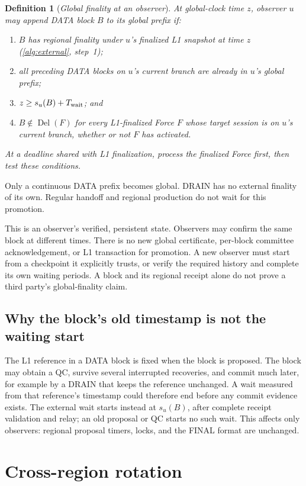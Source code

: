 \documentclass[11pt,a4paper]{article}
\newcommand{\Del}{\operatorname{Del}}
\newcommand{\Twait}{T_{\rm wait}}
\newcommand{\defterm}[1]{\textcolor{rrBlue}{\textit{#1}}}
\newtheorem{definition}{Definition}[section]
\newcounter{protocol}
\begin{document}
\begin{definition}[\defterm{Global finality at an observer}]
\label{def:global-finality}
At global-clock time $z$, observer $u$ may append DATA block $B$ to its
global prefix if:
\begin{enumerate}[label=(\roman*)]
\item $B$ has regional finality under $u$'s finalized L1
snapshot at time $z$ (\cref{alg:external}, step~1);
\item all preceding DATA blocks on $u$'s current branch are already
in $u$'s global prefix;
\item $z\ge s_u(B)+\Twait$; and
\item $B\notin\Del(F)$ for every L1-finalized Force $F$
whose target session is on $u$'s current branch, whether or not $F$ has
activated.
\end{enumerate}
At a deadline shared with L1 finalization, process the finalized Force
first, then test these conditions.
\end{definition}
Only a continuous DATA prefix becomes global. DRAIN has no external
finality of its own. Regular handoff and regional production do not
wait for this promotion.

This is an observer's verified, persistent state. Observers may confirm
the same block at different times. There is no new global certificate,
per-block committee acknowledgement,
or L1 transaction for promotion. A new observer must
start from a checkpoint it explicitly trusts, or verify the required
history and complete its own waiting periods. A block and its regional
receipt alone do not prove a third party's global-finality claim.

\subsection{Why the block's old timestamp is not the waiting start}
\label{sec:late-receipt}
The L1 reference in a DATA block is fixed when the block is
proposed. The block may obtain a QC, survive several interrupted
recoveries, and commit much later, for example by a DRAIN that keeps the
reference unchanged. A wait measured from that reference's timestamp
could therefore end before any commit evidence exists. The external wait
starts instead at $s_u(B)$, after complete receipt validation and relay;
an old proposal or QC starts no such wait. This affects only observers:
regional proposal timers, locks, and the FINAL format are unchanged.

\section{Cross-region rotation}
\label{sec:xprotocols}
\end{document}
